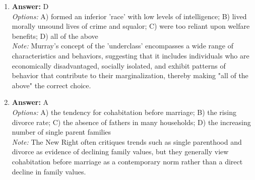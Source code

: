 \documentclass[12pt]{article}
\begin{document}
\begin{enumerate}[label=\arabic*.]
\item \textbf{Answer:} D
\\ \textit{Options:} A) formed an inferior 'race' with low levels of intelligence; B) lived morally unsound lives of crime and squalor; C) were too reliant upon welfare benefits; D) all of the above
\\ \textit{Note:} Murray's concept of the 'underclass' encompasses a wide range of characteristics and behaviors, suggesting that it includes individuals who are economically disadvantaged, socially isolated, and exhibit patterns of behavior that contribute to their marginalization, thereby making "all of the above" the correct choice.
\item \textbf{Answer:} A
\\ \textit{Options:} A) the tendency for cohabitation before marriage; B) the rising divorce rate; C) the absence of fathers in many households; D) the increasing number of single parent families
\\ \textit{Note:} The New Right often critiques trends such as single parenthood and divorce as evidence of declining family values, but they generally view cohabitation before marriage as a contemporary norm rather than a direct decline in family values.
\end{enumerate}
\end{document}
